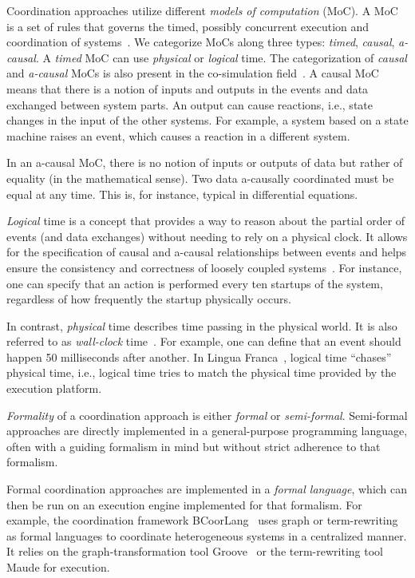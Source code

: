 \documentclass[runningheads]{llncs}
\newcommand{\quotes}[1]{``#1''}
\begin{document}
Coordination approaches utilize different \textit{models of computation} (MoC).
A MoC is a set of rules that governs the timed, possibly concurrent execution and coordination of systems~\cite{ptolemaeusSystemDesignModeling2014}.
We categorize MoCs along three types: \textit{timed}, \textit{causal}, \textit{a-causal}.
A \textit{timed} MoC can use \textit{physical} or \textit{logical} time.
The categorization of \textit{causal} and \textit{a-causal} MoCs is also present in the co-simulation field~\cite{gomesCoSimulationSurvey2019}.
A causal MoC means that there is a notion of inputs and outputs in the events and data exchanged between system parts.
An output can cause reactions, i.e., state changes in the input of the other systems.
For example, a system based on a state machine raises an event, which causes a reaction in a different system.

In an a-causal MoC, there is no notion of inputs or outputs of data but rather of equality (in the mathematical sense).
Two data a-causally coordinated must be equal at any time.
This is, for instance, typical in differential equations.

\textit{Logical} time is a concept that provides a way to reason about the partial order of events (and data exchanges) without needing to rely on a physical clock.
It allows for the specification of causal and a-causal relationships between events and helps ensure the consistency and correctness of loosely coupled systems~\cite{FidgeLogicalTime,T2LogicalTime}.
For instance, one can specify that an action is performed every ten startups of the system, regardless of how frequently the startup physically occurs.

In contrast, \textit{physical} time describes time passing in the physical world.
It is also referred to as \textit{wall-clock} time~\cite{gomesCoSimulationSurvey2019}.
For example, one can define that an event should happen 50 milliseconds after another.
In Lingua Franca~\cite{lohstrohReactorsDeterministicModel2020}, logical time \quotes{chases} physical time, i.e., logical time tries to match the physical time provided by the execution platform.

\textit{Formality} of a coordination approach is either \textit{formal} or \textit{semi-formal}.
Semi-formal approaches are directly implemented in a general-purpose programming language, often with a guiding formalism in mind but without strict adherence to that formalism.

Formal coordination approaches are implemented in a \textit{formal language}, which can then be run on an execution engine implemented for that formalism.
For example, the coordination framework BCoorLang~\cite{krauterBehavioralConsistencyMultimodeling2023} uses graph or term-rewriting as formal languages to coordinate heterogeneous systems in a centralized manner.
It relies on the graph-transformation tool Groove~\cite{rensinkGROOVESimulatorTool2004} or the term-rewriting tool Maude for execution.
\end{document}
